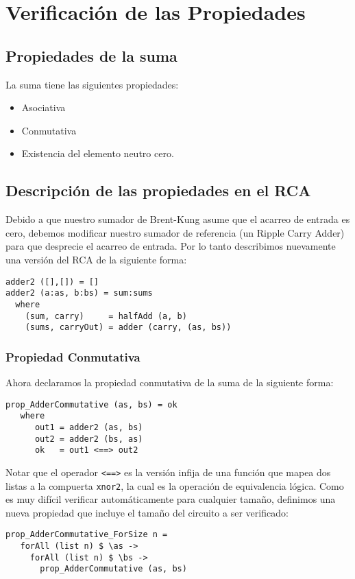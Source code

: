 \section{Verificación de las Propiedades}
\subsection{Propiedades de la suma}
La suma tiene las siguientes propiedades:
\begin{itemize}
\item Asociativa
\item Conmutativa
\item Existencia del elemento neutro cero.
\end{itemize}

\subsection{Descripción de las propiedades en el RCA}
Debido a que nuestro sumador de Brent-Kung asume que el acarreo de entrada es cero, debemos modificar nuestro sumador de referencia (un Ripple Carry Adder) para que desprecie el acarreo de entrada. Por lo tanto describimos nuevamente una versión del RCA de la siguiente forma:


\begin{lstlisting}
adder2 ([],[]) = []
adder2 (a:as, b:bs) = sum:sums
  where
    (sum, carry)     = halfAdd (a, b)
    (sums, carryOut) = adder (carry, (as, bs))
\end{lstlisting}

\subsubsection{Propiedad Conmutativa}
Ahora declaramos la propiedad conmutativa de la suma de la siguiente forma:
\begin{verbatim}
prop_AdderCommutative (as, bs) = ok
   where
      out1 = adder2 (as, bs)
      out2 = adder2 (bs, as)
      ok   = out1 <==> out2
\end{verbatim}
\noindent Notar que el operador {\footnotesize\verb|<==>|} es la versión infija de una función que mapea dos listas a la compuerta {\footnotesize\verb|xnor2|}, la cual es la operación de equivalencia lógica. Como es muy difícil verificar automáticamente para cualquier tamaño, definimos una nueva propiedad que incluye el tamaño del circuito a ser verificado:
\begin{verbatim}
prop_AdderCommutative_ForSize n =
   forAll (list n) $ \as ->
     forAll (list n) $ \bs ->
       prop_AdderCommutative (as, bs)
\end{verbatim}

